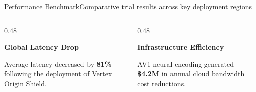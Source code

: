 \documentclass[aspectratio=169,11pt]{beamer}
\begin{document}
\begin{frame}{Performance Benchmark}{Comparative trial results across key deployment regions}
  \vspace{2pt}
  \centering

  \vspace{8pt}
  \begin{columns}[T]
    \begin{column}{0.48\textwidth}
      \begin{tcolorbox}[accentcard]
        {\bfseries\color{accentblue}\faChartBar\quad Global Latency Drop} \par
        \vspace{2pt}
        {\tiny\color{textmuted} Average latency decreased by \textbf{81\%} following the deployment of Vertex Origin Shield.}
      \end{tcolorbox}
    \end{column}
    
    \begin{column}{0.48\textwidth}
      \begin{tcolorbox}[accentcard]
        {\bfseries\color{accentpurple}\faDollarSign\quad Infrastructure Efficiency} \par
        \vspace{2pt}
        {\tiny\color{textmuted} AV1 neural encoding generated \textbf{\$4.2M} in annual cloud bandwidth cost reductions.}
      \end{tcolorbox}
    \end{column}
  \end{columns}
\end{frame}
\end{document}
